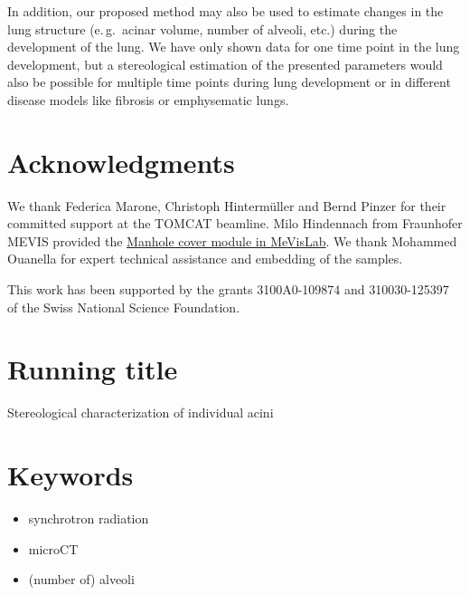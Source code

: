 \documentclass[paper=a4,DIV=calc,abstract,english]{scrartcl}
\newcommand{\eg}{e.\,g.\ }
\begin{document}
In addition, our proposed method may also be used to estimate changes in the lung structure (\eg acinar volume, number of alveoli, etc.) during the development of the lung.
We have only shown data for one time point in the lung development, but a stereological estimation of the presented parameters would also be possible for multiple time points during lung development or in different disease models like fibrosis or emphysematic lungs.

\section{Acknowledgments}
We thank Federica Marone, Christoph Hintermüller and Bernd Pinzer for their committed support at the TOMCAT beamline.
Milo Hindennach from Fraunhofer MEVIS provided the \href{http://www.mevis-research.de/cgi-bin/discus/board-auth.cgi?lm=1282233250&file=/839/11760.html}{Manhole cover module in MeVisLab}.
We thank Mohammed Ouanella for expert technical assistance and embedding of the samples.

This work has been supported by the grants 3100A0-109874 and 310030-125397 of the Swiss National Science Foundation.

\ifJCS
	\singlespacing
\else
\fi

\clearpage
\onecolumn

\section*{Running title}
Stereological characterization of individual acini

\section*{Keywords}
\begin{itemize}
	\item synchrotron radiation 
	\item microCT
	\item (number of) alveoli
\end{itemize}
\end{document}
